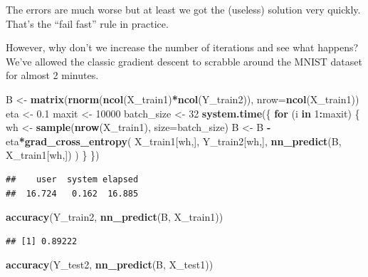 \documentclass[10pt,b5paper,krantz1]{krantz}
\newenvironment{Shaded}{\begin{snugshade}}{\end{snugshade}}
\newcommand{\ControlFlowTok}[1]{\textcolor[rgb]{0.27,0.27,0.27}{\textbf{#1}}}
\newcommand{\DataTypeTok}[1]{\textcolor[rgb]{0.27,0.27,0.27}{#1}}
\newcommand{\DecValTok}[1]{\textcolor[rgb]{0.06,0.06,0.06}{#1}}
\newcommand{\FloatTok}[1]{\textcolor[rgb]{0.06,0.06,0.06}{#1}}
\newcommand{\KeywordTok}[1]{\textcolor[rgb]{0.27,0.27,0.27}{\textbf{#1}}}
\newcommand{\NormalTok}[1]{#1}
\newcommand{\OperatorTok}[1]{\textcolor[rgb]{0.43,0.43,0.43}{\textbf{#1}}}
\newcommand{\StringTok}[1]{\textcolor[rgb]{0.5,0.5,0.5}{#1}}
\begin{document}
The errors are much worse but at least we got the (useless)
solution very quickly. That's the ``fail fast'' rule in practice.

However, why don't we increase the number of iterations and see what
happens? We've allowed the classic gradient descent to scrabble around
the MNIST dataset for almost 2 minutes.

\begin{Shaded}
\begin{Highlighting}[]
\NormalTok{B <-}\StringTok{ }\KeywordTok{matrix}\NormalTok{(}\KeywordTok{rnorm}\NormalTok{(}\KeywordTok{ncol}\NormalTok{(X_train1)}\OperatorTok{*}\KeywordTok{ncol}\NormalTok{(Y_train2)),}
    \DataTypeTok{nrow=}\KeywordTok{ncol}\NormalTok{(X_train1))}
\NormalTok{eta <-}\StringTok{ }\FloatTok{0.1}
\NormalTok{maxit <-}\StringTok{ }\DecValTok{10000}
\NormalTok{batch_size <-}\StringTok{ }\DecValTok{32}
\KeywordTok{system.time}\NormalTok{(\{}
    \ControlFlowTok{for}\NormalTok{ (i }\ControlFlowTok{in} \DecValTok{1}\OperatorTok{:}\NormalTok{maxit) \{}
\NormalTok{        wh <-}\StringTok{ }\KeywordTok{sample}\NormalTok{(}\KeywordTok{nrow}\NormalTok{(X_train1), }\DataTypeTok{size=}\NormalTok{batch_size)}
\NormalTok{        B <-}\StringTok{ }\NormalTok{B }\OperatorTok{-}\StringTok{ }\NormalTok{eta}\OperatorTok{*}\KeywordTok{grad_cross_entropy}\NormalTok{(}
\NormalTok{            X_train1[wh,], Y_train2[wh,],}
            \KeywordTok{nn_predict}\NormalTok{(B, X_train1[wh,])}
\NormalTok{        )}
\NormalTok{    \}}
\NormalTok{\})}
\end{Highlighting}
\end{Shaded}

\begin{verbatim}
##    user  system elapsed 
##  16.724   0.162  16.885
\end{verbatim}

\begin{Shaded}
\begin{Highlighting}[]
\KeywordTok{accuracy}\NormalTok{(Y_train2, }\KeywordTok{nn_predict}\NormalTok{(B, X_train1))}
\end{Highlighting}
\end{Shaded}

\begin{verbatim}
## [1] 0.89222
\end{verbatim}

\begin{Shaded}
\begin{Highlighting}[]
\KeywordTok{accuracy}\NormalTok{(Y_test2,  }\KeywordTok{nn_predict}\NormalTok{(B, X_test1))}
\end{Highlighting}
\end{Shaded}
\end{document}
